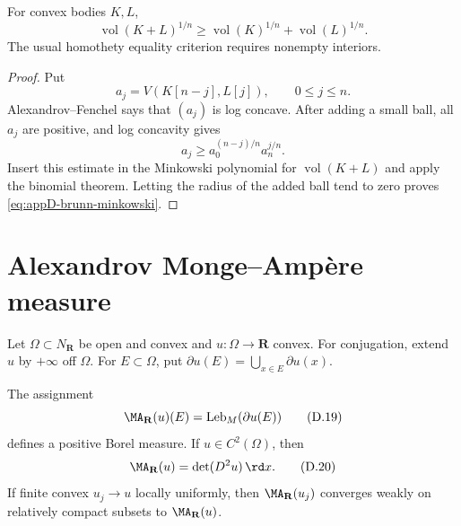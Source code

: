 \begin{corollary}\label{cor:appD-brunn-minkowski}
For convex bodies \(K,L\),
\[
 \operatorname{vol}(K+L)^{1/n}
 \geq
 \operatorname{vol}(K)^{1/n}
 +\operatorname{vol}(L)^{1/n}.
\tag{D.18}\label{eq:appD-brunn-minkowski}
\]
The usual homothety equality criterion requires nonempty interiors.
\end{corollary}

\begin{proof}
Put
\[
 a_j=V(K[n-j],L[j]),\qquad 0\leq j\leq n.
\]
Alexandrov--Fenchel says that \((a_j)\) is log concave.
After adding a small ball, all \(a_j\) are positive, and log concavity gives
\[
 a_j\geq a_0^{(n-j)/n}a_n^{j/n}.
\]
Insert this estimate in the Minkowski polynomial for
\(\operatorname{vol}(K+L)\) and apply the binomial theorem.
Letting the radius of the added ball tend to zero proves
\eqref{eq:appD-brunn-minkowski}.
\end{proof}

\section{Alexandrov Monge--Amp\`ere measure}
\label{sec:appD-real-ma}

Let \(\Omega\subset N_{\mathbf R}\) be open and convex and
\(u:\Omega\to\mathbf R\) convex.
For conjugation, extend \(u\) by \(+\infty\) off \(\Omega\).
For \(E\subset\Omega\), put
\(\partial u(E)=\bigcup_{x\in E}\partial u(x)\).

\begin{theorem}\label{thm:appD-alexandrov-measure}
The assignment
\[
 \MA_{\mathbf R}(u)(E)
 =\operatorname{Leb}_M(\partial u(E))
\tag{D.19}\label{eq:appD-alexandrov-measure}
\]
defines a positive Borel measure.
If \(u\in C^2(\Omega)\), then
\[
 \MA_{\mathbf R}(u)=\det(D^2u)\,\rd x.
\tag{D.20}\label{eq:appD-smooth-real-ma}
\]
If finite convex \(u_j\to u\) locally uniformly, then
\(\MA_{\mathbf R}(u_j)\) converges weakly on relatively compact subsets to
\(\MA_{\mathbf R}(u)\).
\end{theorem}

